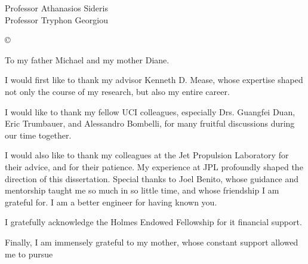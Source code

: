




\othercommitteemembers
{
  Professor Athanasios Sideris\\
  Professor Tryphon Georgiou
}


\copyrightdeclaration
{
  {\copyright} {\Degreeyear} \Authorname
}


\dedications
{ 
  To my father Michael and my mother Diane.
}

\acknowledgments
{
  I would first like to thank my advisor Kenneth D. Mease, whose expertise shaped not only the course of my research, but also my entire career. 
  
  I would like to thank my fellow UCI colleagues, especially Drs. Guangfei Duan, Eric Trumbauer, and Alessandro Bombelli, for many fruitful discussions during our time together.
  
  I would also like to thank my colleagues at the Jet Propulsion Laboratory for their advice, and for their patience. My experience at JPL profoundly shaped the direction of this dissertation. Special thanks to Joel Benito, whose guidance and mentorship taught me so much in so little time, and whose friendship I am grateful for. I am a better engineer for having known you. 
  
  I gratefully acknowledge the Holmes Endowed Fellowship for it financial support. 
  
  Finally, I am immensely grateful to my mother, whose constant support allowed me to pursue 
  
}


